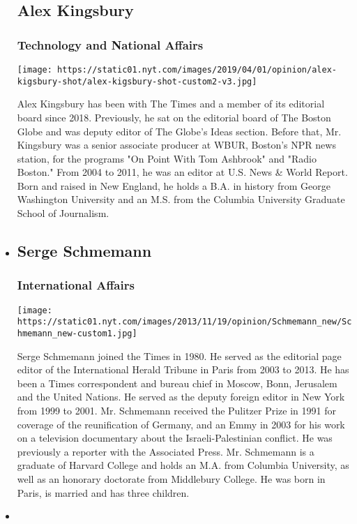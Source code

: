 \begin{itemize}
{  \subsection{Alex Kingsbury}\label{alex-kingsbury}}

  \hypertarget{technology-and-national-affairs}{%
  \subsubsection{Technology and National
  Affairs}\label{technology-and-national-affairs}}

  \texttt{[image: https://static01.nyt.com/images/2019/04/01/opinion/alex-kigsbury-shot/alex-kigsbury-shot-custom2-v3.jpg]}

  Alex Kingsbury has been with The Times and a member of its editorial
  board since 2018. Previously, he sat on the editorial board of The
  Boston Globe and was deputy editor of The Globe's Ideas section.
  Before that, Mr. Kingsbury was a senior associate producer at WBUR,
  Boston's NPR news station, for the programs "On Point With Tom
  Ashbrook" and "Radio Boston." From 2004 to 2011, he was an editor at
  U.S. News \& World Report. Born and raised in New England, he holds a
  B.A. in history from George Washington University and an M.S. from the
  Columbia University Graduate School of Journalism.
\item
  \hypertarget{serge-schmemann}{%
  \subsection{Serge Schmemann}\label{serge-schmemann}}

  \hypertarget{international-affairs}{%
  \subsubsection{International Affairs}\label{international-affairs}}

  \texttt{[image: https://static01.nyt.com/images/2013/11/19/opinion/Schmemann\_new/Schmemann\_new-custom1.jpg]}

  Serge Schmemann joined the Times in 1980. He served as the editorial
  page editor of the International Herald Tribune in Paris from 2003 to
  2013. He has been a Times correspondent and bureau chief in Moscow,
  Bonn, Jerusalem and the United Nations. He served as the deputy
  foreign editor in New York from 1999 to 2001. Mr. Schmemann received
  the Pulitzer Prize in 1991 for coverage of the reunification of
  Germany, and an Emmy in 2003 for his work on a television documentary
  about the Israeli-Palestinian conflict. He was previously a reporter
  with the Associated Press. Mr. Schmemann is a graduate of Harvard
  College and holds an M.A. from Columbia University, as well as an
  honorary doctorate from Middlebury College. He was born in Paris, is
  married and has three children.
\item
  \hypertarget{brent-staples}{%
}
\end{itemize}
